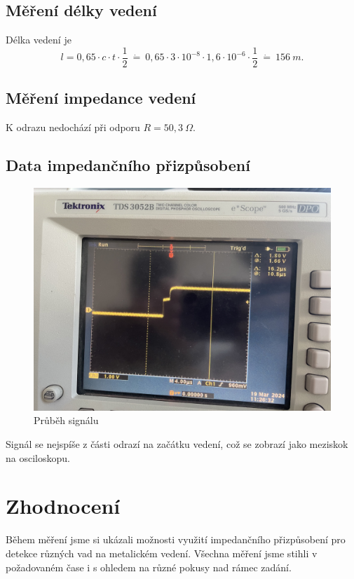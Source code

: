 \subsection{Měření délky vedení}
Délka vedení je \[l = 0,65 \cdot c \cdot t \cdot \frac{1}{2}\ \dot{=}\ 0,65 \cdot 3 \cdot 10^{-8} \cdot 1,6 \cdot 10^{-6} \cdot \frac{1}{2}\  \dot{=}\  156\ m.\]
\subsection{Měření impedance vedení}
K odrazu nedochází při odporu $R = 50,3\ \Omega$.
\newpage
\subsection{Data impedančního přizpůsobení}
\begin{figure}[h]
\centering
\includegraphics[width=13cm]{images/obr_4.jpg}
\caption{Průběh signálu}
\label{fig:6}
\end{figure}
Signál se nejspíše z části odrazí na začátku vedení, což se zobrazí jako meziskok na osciloskopu.
\section{Zhodnocení}
Během měření jsme si ukázali možnosti využití impedančního přizpůsobení pro detekce různých vad na metalickém vedení. Všechna měření jsme stihli v požadovaném čase i s ohledem na různé pokusy nad rámec zadání.